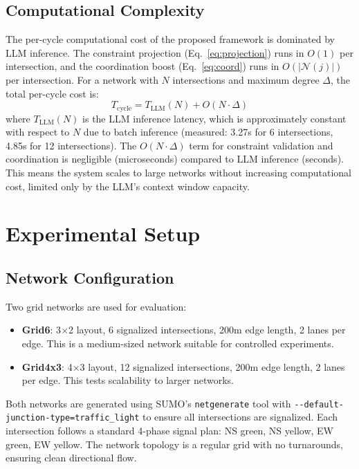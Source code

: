 \documentclass[conference]{IEEEtran}
\begin{document}
\subsection{Computational Complexity}
The per-cycle computational cost of the proposed framework is dominated by LLM inference. The constraint projection (Eq.~\ref{eq:projection}) runs in $O(1)$ per intersection, and the coordination boost (Eq.~\ref{eq:coord}) runs in $O(|\mathcal{N}(j)|)$ per intersection. For a network with $N$ intersections and maximum degree $\Delta$, the total per-cycle cost is:
\begin{equation}
    T_{\text{cycle}} = T_{\text{LLM}}(N) + O(N \cdot \Delta)
    \label{eq:complexity}
\end{equation}
where $T_{\text{LLM}}(N)$ is the LLM inference latency, which is approximately constant with respect to $N$ due to batch inference (measured: 3.27s for 6 intersections, 4.85s for 12 intersections). The $O(N \cdot \Delta)$ term for constraint validation and coordination is negligible (microseconds) compared to LLM inference (seconds). This means the system scales to large networks without increasing computational cost, limited only by the LLM's context window capacity.


\section{Experimental Setup}
\label{sec:setup}

\subsection{Network Configuration}
Two grid networks are used for evaluation:
\begin{itemize}[nosep]
    \item \textbf{Grid6}: 3$\times$2 layout, 6 signalized intersections, 200m edge length, 2 lanes per edge. This is a medium-sized network suitable for controlled experiments.
    \item \textbf{Grid4x3}: 4$\times$3 layout, 12 signalized intersections, 200m edge length, 2 lanes per edge. This tests scalability to larger networks.
\end{itemize}
Both networks are generated using SUMO's \texttt{netgenerate} tool with \texttt{-{}-default-junction-type=traffic\_light} to ensure all intersections are signalized. Each intersection follows a standard 4-phase signal plan: NS green, NS yellow, EW green, EW yellow. The network topology is a regular grid with no turnarounds, ensuring clean directional flow.
\end{document}

